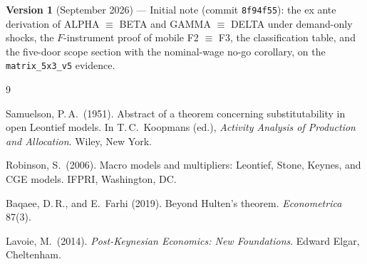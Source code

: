 \documentclass[11pt]{article}
\numberwithin{equation}{section}
\begin{document}
\noindent\textbf{Version 1} (September 2026) --- Initial note (commit
\texttt{8f94f55}): the ex ante derivation of ALPHA $\equiv$ BETA and GAMMA
$\equiv$ DELTA under demand-only shocks, the $F$-instrument proof of mobile
F2 $\equiv$ F3, the classification table, and the five-door scope section
with the nominal-wage no-go corollary, on the \texttt{matrix\_5x3\_v5}
evidence.

\begin{thebibliography}{9}

Samuelson, P.\,A.\ (1951). Abstract of a theorem concerning substitutability
in open Leontief models. In T.\,C.\ Koopmans (ed.),
\emph{Activity Analysis of Production and Allocation}. Wiley, New York.

Robinson, S.\ (2006). Macro models and multipliers: Leontief, Stone, Keynes,
and CGE models. IFPRI, Washington, DC.

Baqaee, D.\,R., and E.\ Farhi (2019). Beyond Hulten's theorem.
\emph{Econometrica} 87(3).

Lavoie, M.\ (2014). \emph{Post-Keynesian Economics: New Foundations}.
Edward Elgar, Cheltenham.

\end{thebibliography}
\end{document}

